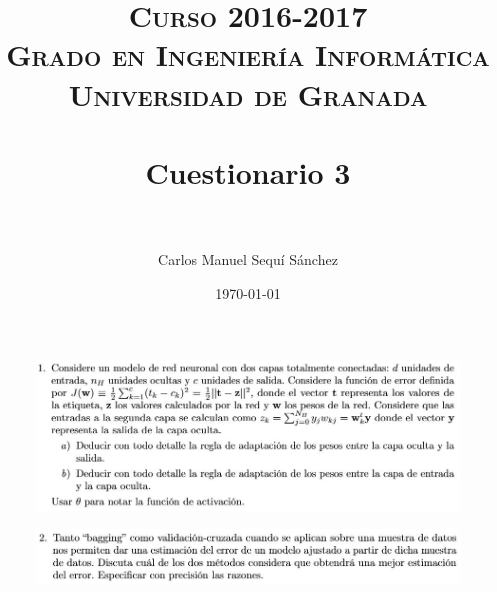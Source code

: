 


\title{	
\normalfont \normalsize 
\textsc{\textbf{Curso 2016-2017} \\ Grado en Ingeniería Informática \\ Universidad de Granada} \\ [25pt] %
\horrule{0.5pt} \\[0.4cm] %
\huge Cuestionario 3 \\ %
\horrule{2pt} \\[0.5cm] %
}

\author{Carlos Manuel Sequí Sánchez} %

\date{\normalsize\today} %




\maketitle %

\newpage %

\newpage



\begin{figure}[H]
	\includegraphics[scale=0.65]{imagenes/1} 
\end{figure}

\newpage

\begin{figure}[H]
	\includegraphics[scale=0.65]{imagenes/2} 
\end{figure}

